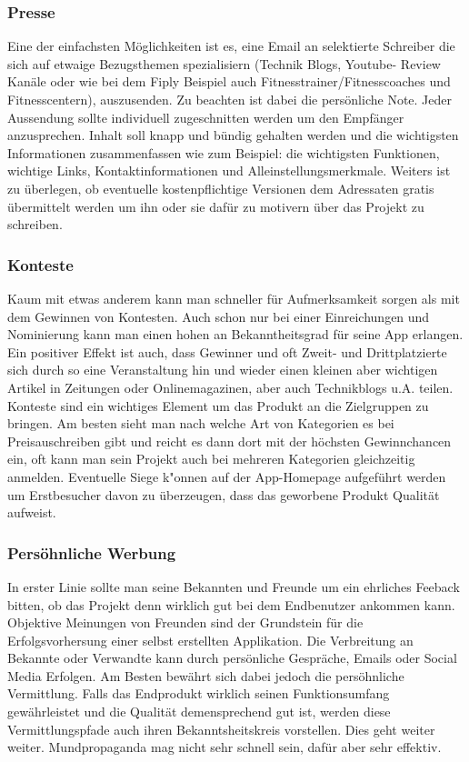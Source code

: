 \documentclass[FIPLY_base.tex]{subfiles}
\begin{document}
\subsubsection{Presse}
Eine der einfachsten Möglichkeiten ist es, eine Email an selektierte Schreiber die sich auf etwaige Bezugsthemen spezialisiern (Technik Blogs, Youtube- Review Kanäle oder wie bei dem Fiply Beispiel auch Fitnesstrainer/Fitnesscoaches und Fitnesscentern), auszusenden. Zu beachten ist dabei die persönliche Note. Jeder Aussendung sollte individuell zugeschnitten werden um den Empfänger anzusprechen. Inhalt soll knapp und bündig gehalten werden und die wichtigsten Informationen zusammenfassen wie zum Beispiel: die wichtigsten Funktionen, wichtige Links, Kontaktinformationen und Alleinstellungsmerkmale. Weiters ist zu überlegen, ob eventuelle kostenpflichtige Versionen dem Adressaten gratis übermittelt werden um ihn oder sie dafür zu motivern über das Projekt zu schreiben. 

\subsubsection{Konteste}
Kaum mit etwas anderem kann man schneller für Aufmerksamkeit sorgen als mit dem Gewinnen von Kontesten. Auch schon nur bei einer Einreichungen und Nominierung kann man einen hohen an Bekanntheitsgrad für seine App erlangen. Ein positiver Effekt ist auch, dass Gewinner und oft Zweit- und Drittplatzierte sich durch so eine Veranstaltung hin und wieder einen kleinen aber wichtigen Artikel in Zeitungen oder Onlinemagazinen, aber auch Technikblogs u.A. teilen. Konteste sind ein wichtiges Element um das Produkt an die Zielgruppen zu bringen. Am besten sieht man nach welche Art von Kategorien es bei Preisauschreiben gibt und reicht es dann dort mit der höchsten Gewinnchancen ein, oft kann man sein Projekt auch bei mehreren Kategorien gleichzeitig anmelden. 
\newline
Eventuelle Siege k"onnen auf der App-Homepage aufgeführt werden um Erstbesucher davon zu überzeugen, dass das geworbene Produkt Qualität aufweist.

\subsubsection{Persöhnliche Werbung}
In erster Linie sollte man seine Bekannten und Freunde um ein ehrliches Feeback bitten, ob das Projekt denn wirklich gut bei dem Endbenutzer ankommen kann. Objektive Meinungen von Freunden sind der Grundstein für die Erfolgsvorhersung einer selbst erstellten Applikation. Die Verbreitung an Bekannte oder Verwandte kann durch persönliche Gespräche, Emails oder Social Media Erfolgen. Am Besten bewährt sich dabei jedoch die persöhnliche Vermittlung. Falls das Endprodukt wirklich seinen Funktionsumfang gewährleistet und die Qualität demensprechend gut ist, werden diese Vermittlungspfade auch ihren Bekanntsheitskreis vorstellen. Dies geht weiter weiter. Mundpropaganda mag nicht sehr schnell sein, dafür aber sehr effektiv.
\end{document}
